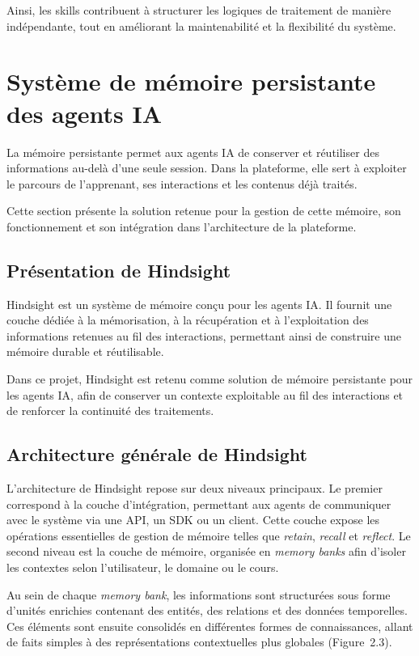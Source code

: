 Ainsi, les skills contribuent à structurer les logiques de traitement de manière indépendante, tout en améliorant la maintenabilité et la flexibilité du système.

\section{Système de mémoire persistante des agents IA}

La mémoire persistante permet aux agents IA de conserver et réutiliser des informations au-delà d'une seule session. Dans la plateforme, elle sert à exploiter le parcours de l'apprenant, ses interactions et les contenus déjà traités.

Cette section présente la solution retenue pour la gestion de cette mémoire, son fonctionnement et son intégration dans l'architecture de la plateforme.

\subsection{Présentation de Hindsight}

Hindsight \cite{hindsight_github} est un système de mémoire conçu pour les agents IA. Il fournit une couche dédiée à la mémorisation, à la récupération et à l'exploitation des informations retenues au fil des interactions, permettant ainsi de construire une mémoire durable et réutilisable.

Dans ce projet, Hindsight est retenu comme solution de mémoire persistante pour les agents IA, afin de conserver un contexte exploitable au fil des interactions et de renforcer la continuité des traitements.

\subsection{Architecture générale de Hindsight}

L'architecture de Hindsight repose sur deux niveaux principaux. Le premier correspond à la couche d'intégration, permettant aux agents de communiquer avec le système via une API, un SDK ou un client. Cette couche expose les opérations essentielles de gestion de mémoire telles que \textit{retain}, \textit{recall} et \textit{reflect}. Le second niveau est la couche de mémoire, organisée en \textit{memory banks} afin d'isoler les contextes selon l'utilisateur, le domaine ou le cours.

Au sein de chaque \textit{memory bank}, les informations sont structurées sous forme d'unités enrichies contenant des entités, des relations et des données temporelles. Ces éléments sont ensuite consolidés en différentes formes de connaissances, allant de faits simples à des représentations contextuelles plus globales (Figure~2.3).

